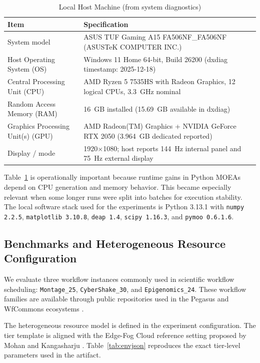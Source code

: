 \documentclass[preprint,12pt]{elsarticle}
\begin{document}
\begin{table}[t]
\caption{Local Host Machine (from system diagnostics)}
\label{tab:hardware}
\centering
\small
\begin{tabularx}{\textwidth}{@{}l X@{}}
\toprule
Item & Specification \\
\midrule
System model & ASUS TUF Gaming A15 FA506NF\_FA506NF (ASUSTeK COMPUTER INC.) \\
Host Operating System (OS) & Windows 11 Home 64-bit, Build 26200 (dxdiag timestamp: 2025-12-18) \\
Central Processing Unit (CPU) & AMD Ryzen 5 7535HS with Radeon Graphics, 12 logical CPUs, \SI{3.3}{GHz} nominal \\
Random Access Memory (RAM) & \SI{16}{GB} installed (\SI{15.69}{GB} available in dxdiag) \\
Graphics Processing Unit(s) (GPU) & AMD Radeon(TM) Graphics + NVIDIA GeForce RTX 2050 (\SI{3.964}{GB} dedicated reported) \\
Display / mode & 1920$\times$1080; host reports 144~Hz internal panel and 75~Hz external display \\
\bottomrule
\end{tabularx}
\end{table}

Table~\ref{tab:hardware} is operationally important because runtime gains in Python MOEAs depend on CPU generation and memory behavior. This became especially relevant when some longer runs were split into batches for execution stability. The local software stack used for the experiments is Python 3.13.1 with \texttt{numpy 2.2.5}, \texttt{matplotlib 3.10.8}, \texttt{deap 1.4}, \texttt{scipy 1.16.3}, and \texttt{pymoo 0.6.1.6}.

\subsection{Benchmarks and Heterogeneous Resource Configuration}
We evaluate three workflow instances commonly used in scientific workflow scheduling: \texttt{Montage\_25}, \texttt{CyberShake\_30}, and \texttt{Epigenomics\_24}. These workflow families are available through public repositories used in the Pegasus and WfCommons ecosystems \cite{coleman2021wfcommons}.

The heterogeneous resource model is defined in the experiment configuration. The tier template is aligned with the Edge-Fog Cloud reference setting proposed by Mohan and Kangasharju \cite{mohan2016edgefog}. Table~\ref{tab:envjson} reproduces the exact tier-level parameters used in the artifact.
\end{document}
